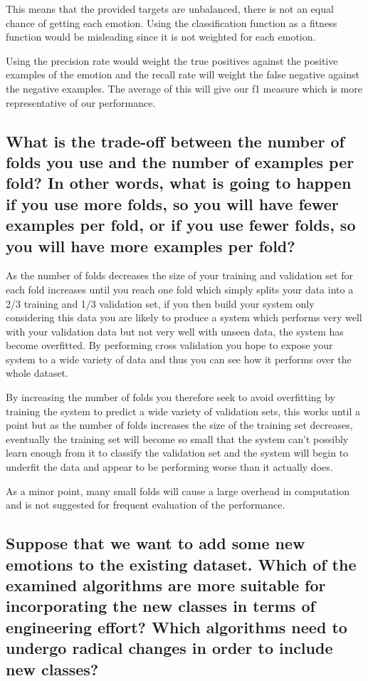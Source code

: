 \documentclass[11pt]{article}
\begin{document}
This means that the provided targets are unbalanced, there is not an equal chance of getting each emotion. Using the classification function as a fitness function would be misleading since it is not weighted for each emotion.

Using the precision rate would weight the true positives against the positive examples of the emotion and the recall rate will weight the false negative against the negative examples. The average of this will give our f1 measure which is more representative of our performance. 

\subsection{What is the trade-off between the number of folds you use and the number of examples per fold? In other words, what is going to happen if you use more folds, so you will have fewer examples per fold, or if you use fewer folds, so you will have more examples per fold?}
As the number of folds decreases the size of your training and validation set for each fold increases until you reach one fold which simply splits your data into a 2/3 training and 1/3 validation set, if you then build your system only considering this data you are likely to produce a system which performs very well with your validation data but not very well with unseen data, the system has become overfitted. By performing cross validation you hope to expose your system to a wide variety of data and thus you can see how it performs over the whole dataset.

By increasing the number of folds you therefore seek to avoid overfitting by training the system to predict a wide variety of validation sets, this works until a point but as the number of folds increases the size of the training set decreases, eventually the training set will become so small that the system can't possibly learn enough from it to classify the validation set and the system will begin to underfit the data and appear to be performing worse than it actually does.

As a minor point, many small folds will cause a large overhead in computation and is not suggested for frequent evaluation of the performance. 


\subsection{Suppose that we want to add some new emotions to the existing dataset. Which of the examined algorithms are more suitable for incorporating the new classes in terms of engineering effort? Which algorithms need to undergo radical changes in order to include new classes?}
\end{document}
